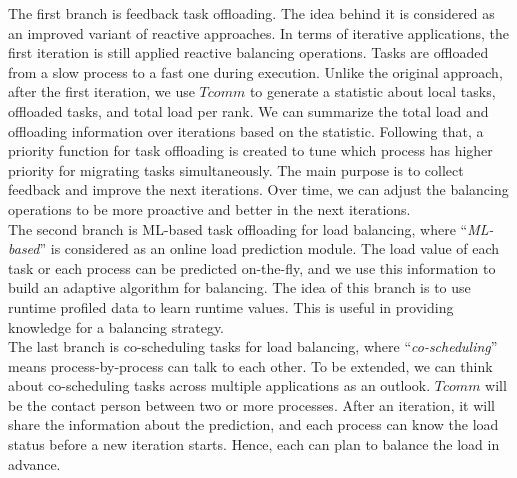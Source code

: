 The first branch is feedback task offloading. The idea behind it is considered as an improved variant of reactive approaches. In terms of iterative applications, the first iteration is still applied reactive balancing operations. Tasks are offloaded from a slow process to a fast one during execution. Unlike the original approach, after the first iteration, we use $Tcomm$ to generate a statistic about local tasks, offloaded tasks, and total load per rank. We can summarize the total load and offloading information over iterations based on the statistic. Following that, a priority function for task offloading is created to tune which process has higher priority for migrating tasks simultaneously. The main purpose is to collect feedback and improve the next iterations. Over time, we can adjust the balancing operations to be more proactive and better in the next iterations. \\

The second branch is ML-based task offloading for load balancing, where ``\textit{ML-based}'' is considered as an online load prediction module. The load value of each task or each process can be predicted on-the-fly, and we use this information to build an adaptive algorithm for balancing. The idea of this branch is to use runtime profiled data to learn runtime values. This is useful in providing knowledge for a balancing strategy. \\

The last branch is co-scheduling tasks for load balancing, where ``\textit{co-scheduling}'' means process-by-process can talk to each other. To be extended, we can think about co-scheduling tasks across multiple applications as an outlook. $Tcomm$ will be the contact person between two or more processes. After an iteration, it will share the information about the prediction, and each process can know the load status before a new iteration starts. Hence, each can plan to balance the load in advance.

%
%
